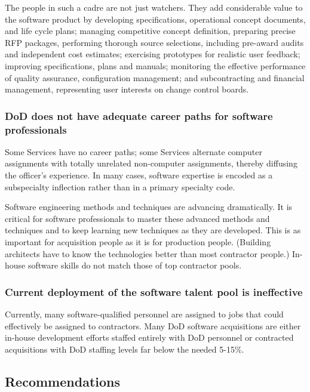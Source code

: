 \documentclass[12pt,final]{article}
\begin{document}
The people in such a cadre are not just watchers. They add considerable value
to the software product by developing specifications, operational concept
documents, and life cycle plans; managing competitive concept definition,
preparing precise RFP packages, performing thorough source selections,
including pre-award audits and independent cost estimates; exercising
prototypes for realistic user feedback; improving specifications, plans and
manuals; monitoring the effective performance of quality assurance,
configuration management; and subcontracting and financial management,
representing user interests on change control boards.

\subsubsection*{DoD does not have adequate career paths for software professionals}

Some Services have no career paths; some Services alternate computer
assignments with totally unrelated non-computer assignments, thereby diffusing
the officer’s experience. In many cases, software expertise is encoded as a
subspecialty inflection rather than in a primary specialty code.

Software engineering methods and techniques are advancing dramatically. It is
critical for software professionals to master these advanced methods and
techniques and to keep learning new techniques as they are developed. This is
as important for acquisition people as it is for production people. (Building
architects have to know the technologies better than most contractor people.)
In-house software skills do not match those of top contractor pools.

\subsubsection*{Current deployment of the software talent pool is ineffective}

Currently, many software-qualified personnel are assigned to jobs that could
effectively be assigned to contractors. Many DoD software acquisitions are
either in-house development efforts staffed entirely with DoD personnel or
contracted acquisitions with DoD staffing levels far below the needed 5-15\%.

\subsection*{Recommendations}
\end{document}
